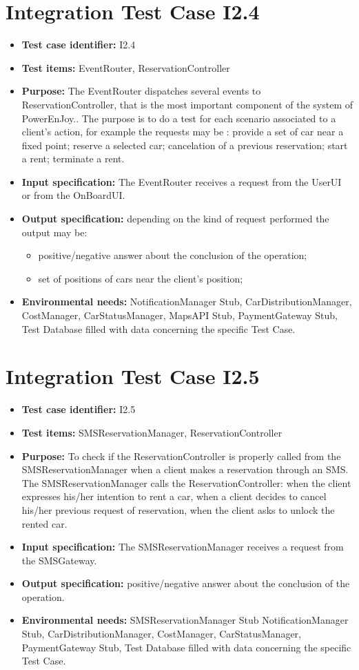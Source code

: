 \section{Integration Test Case I2.4}
\begin{itemize}
\item \textbf{Test case identifier:} I2.4
\item \textbf{Test items:} EventRouter, ReservationController
\item \textbf{Purpose:} The EventRouter dispatches several events to ReservationController, that is the most important component of the system of PowerEnJoy.. The purpose is to do a test for each scenario associated to a client’s action, for example the requests may be : provide a set of car near a fixed point; reserve a selected car; cancelation of a previous reservation; start a rent; terminate a rent.
\item \textbf{Input specification:} The EventRouter receives a request from the UserUI or from the OnBoardUI.
\item \textbf{Output specification:} depending on the kind of request performed the output may be:
\begin{itemize}
\item positive/negative answer about the conclusion of the operation;
\item set of positions of cars near the client’s position;
\end{itemize}
\item \textbf{Environmental needs:} NotificationManager Stub, CarDistributionManager, CostManager, CarStatusManager, MapsAPI Stub, PaymentGateway Stub, Test Database filled with data concerning the specific Test Case.
\end{itemize}

\section{Integration Test Case I2.5}
\begin{itemize}
\item \textbf{Test case identifier:} I2.5
\item \textbf{Test items:} SMSReservationManager, ReservationController
\item \textbf{Purpose:} To check if the ReservationController is properly called from the SMSReservationManager when a client makes a reservation through an SMS. The SMSReservationManager calls the ReservationController: when the client expresses his/her intention to rent a car, when a client decides to cancel his/her previous request of reservation, when the client asks to unlock the rented car.
\item \textbf{Input specification:} The SMSReservationManager receives a request from the SMSGateway.
\item \textbf{Output specification:} positive/negative answer about the conclusion of the operation.
\item \textbf{Environmental needs:} SMSReservationManager Stub NotificationManager Stub, CarDistributionManager, CostManager, CarStatusManager, PaymentGateway Stub, Test Database filled with data concerning the specific Test Case.
\end{itemize}

